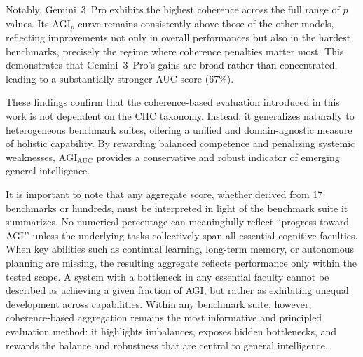 \documentclass{article}
\begin{document}
Notably, Gemini~3~Pro exhibits the highest coherence across the full range of $p$ values. Its $\mathrm{AGI}_p$ curve remains consistently above those of the other models, reflecting improvements not only in overall performances but also in the hardest benchmarks, precisely the regime where coherence penalties matter most. This demonstrates that Gemini~3~Pro’s gains are broad rather than concentrated, leading to a substantially stronger AUC score (67\%).

These findings confirm that the coherence-based evaluation introduced in this work is not dependent on the CHC taxonomy. Instead, it generalizes naturally to heterogeneous benchmark suites, offering a unified and domain-agnostic measure of holistic capability. By rewarding balanced competence and penalizing systemic weaknesses, $\mathrm{AGI}_{\mathrm{AUC}}$ provides a conservative and robust indicator of emerging general intelligence.

It is important to note that any aggregate score, whether derived from 17 benchmarks or hundreds, must be interpreted in light of the benchmark suite it summarizes. No numerical percentage can meaningfully reflect “progress toward AGI’’ unless the underlying tasks collectively span all essential cognitive faculties. When key abilities such as continual learning, long-term memory, or autonomous planning are missing, the resulting aggregate reflects performance only within the tested scope. A system with a bottleneck in any essential faculty cannot be described as achieving a given fraction of AGI, but rather as exhibiting unequal development across capabilities. Within any benchmark suite, however, coherence-based aggregation remains the most informative and principled evaluation method: it highlights imbalances, exposes hidden bottlenecks, and rewards the balance and robustness that are central to general intelligence.
\end{document}
